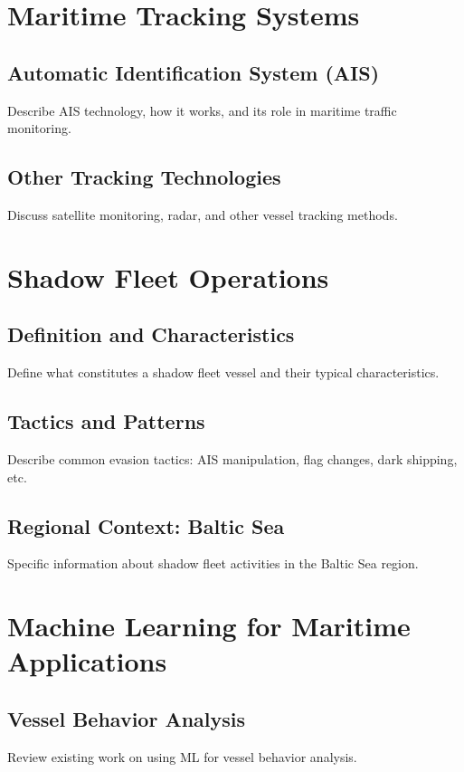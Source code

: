 
\section{Maritime Tracking Systems}
\subsection{Automatic Identification System (AIS)}
Describe AIS technology, how it works, and its role in maritime traffic monitoring.

\subsection{Other Tracking Technologies}
Discuss satellite monitoring, radar, and other vessel tracking methods.

\section{Shadow Fleet Operations}
\subsection{Definition and Characteristics}
Define what constitutes a shadow fleet vessel and their typical characteristics.

\subsection{Tactics and Patterns}
Describe common evasion tactics: AIS manipulation, flag changes, dark shipping, etc.

\subsection{Regional Context: Baltic Sea}
Specific information about shadow fleet activities in the Baltic Sea region.

\section{Machine Learning for Maritime Applications}
\subsection{Vessel Behavior Analysis}
Review existing work on using ML for vessel behavior analysis.

